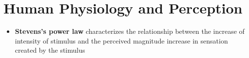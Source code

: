 \chapter{Human Physiology and Perception}

\begin{itemize}
  \item \textbf{Stevens's power law} characterizes the relationship
  between the increase of intensity of stimulus and the perceived magnitude
  increase in sensation created by the stimulus
\end{itemize}
